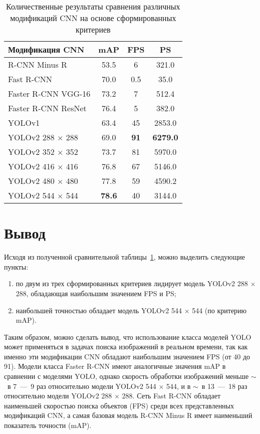 \clearpage
\begin{table}[!ht]
	\centering
	\caption{\label{table1} Количественные результаты сравнения различных модификаций CNN на основе сформированных критериев}
	\begin{tabularx}{\textwidth}{|X|c|c|c|}
		\hline
		Модификация CNN & mAP & FPS & PS \\ \hline
		R-CNN Minus R & 53.5 & 6 & 321.0 \\ \hline
		Fast R-CNN & 70.0 & 0.5 & 35.0 \\ \hline
		Faster R-CNN VGG-16 & 73.2 & 7 & 512.4 \\ \hline
		Faster R-CNN ResNet & 76.4 & 5 & 382.0 \\ \hline
		YOLOv1 & 63.4 & 45 & 2853.0 \\ \hline
		YOLOv2 288 $\times$ 288 & 69.0 & \textbf{91} & \textbf{6279.0} \\ \hline
		YOLOv2 352 $\times$ 352 & 73.7 & 81 & 5970.0 \\ \hline
		YOLOv2 416 $\times$ 416 & 76.8 & 67 & 5146.0 \\ \hline
		YOLOv2 480 $\times$ 480 & 77.8 & 59 & 4590.2 \\ \hline
		YOLOv2 544 $\times$ 544 & \textbf{78.6} & 40 & 3144.0 \\ \hline
	\end{tabularx}
\end{table}

\section*{Вывод}

Исходя из полученной сравнительной таблицы~\ref{table1}, можно выделить следующие пункты:
\begin{enumerate}[leftmargin=1.6\parindent]
	\item по двум из трех сформированных критериев лидирует модель YOLOv2 288 $\times$ 288, обладающая наибольшим значением FPS и PS;
	\item наибольшей точностью обладает модель YOLOv2 544 $\times$ 544 (по критерию mAP).
\end{enumerate}

Таким образом, можно сделать вывод, что использование класса моделей YOLO может применяться в задачах поиска изображений в реальном времени, так как именно эти модификации CNN обладают наибольшим значением FPS (от 40 до 91).
Модели класса Faster R-CNN имеют аналогичные значения mAP в сравнении с моделями YOLO, однако скорость обработки изображений меньше $\sim$~в  7~---~9 раз относительно модели YOLOv2 544 $\times$ 544, и в $\sim$~в  13~---~18 раз относительно модели YOLOv2 288 $\times$ 288.
Сеть Fast R-CNN обладает наименьшей скоростью поиска объектов (FPS) среди всех представленных модификаций CNN, а самая базовая модель R-CNN Minus R имеет наименьший показатель точности (mAP).